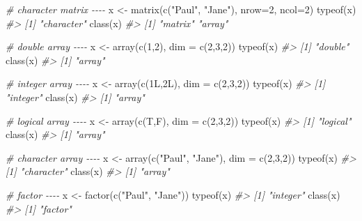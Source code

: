 \documentclass[
]{book}
\newenvironment{Shaded}{\begin{snugshade}}{\end{snugshade}}
\newcommand{\AttributeTok}[1]{\textcolor[rgb]{0.77,0.63,0.00}{#1}}
\newcommand{\CommentTok}[1]{\textcolor[rgb]{0.56,0.35,0.01}{\textit{#1}}}
\newcommand{\DecValTok}[1]{\textcolor[rgb]{0.00,0.00,0.81}{#1}}
\newcommand{\FunctionTok}[1]{\textcolor[rgb]{0.00,0.00,0.00}{#1}}
\newcommand{\NormalTok}[1]{#1}
\newcommand{\OtherTok}[1]{\textcolor[rgb]{0.56,0.35,0.01}{#1}}
\newcommand{\StringTok}[1]{\textcolor[rgb]{0.31,0.60,0.02}{#1}}
\begin{document}
\begin{Shaded}
\begin{Highlighting}[]
\CommentTok{\# character matrix {-}{-}{-}{-}}
\NormalTok{x }\OtherTok{\textless{}{-}} \FunctionTok{matrix}\NormalTok{(}\FunctionTok{c}\NormalTok{(}\StringTok{"Paul"}\NormalTok{, }\StringTok{"Jane"}\NormalTok{), }\AttributeTok{nrow=}\DecValTok{2}\NormalTok{, }\AttributeTok{ncol=}\DecValTok{2}\NormalTok{)}
\FunctionTok{typeof}\NormalTok{(x)}
\CommentTok{\#\textgreater{} [1] "character"}
\FunctionTok{class}\NormalTok{(x)}
\CommentTok{\#\textgreater{} [1] "matrix" "array"}

\CommentTok{\# double array {-}{-}{-}{-}}
\NormalTok{x }\OtherTok{\textless{}{-}} \FunctionTok{array}\NormalTok{(}\FunctionTok{c}\NormalTok{(}\DecValTok{1}\NormalTok{,}\DecValTok{2}\NormalTok{), }\AttributeTok{dim =} \FunctionTok{c}\NormalTok{(}\DecValTok{2}\NormalTok{,}\DecValTok{3}\NormalTok{,}\DecValTok{2}\NormalTok{))}
\FunctionTok{typeof}\NormalTok{(x)}
\CommentTok{\#\textgreater{} [1] "double"}
\FunctionTok{class}\NormalTok{(x)}
\CommentTok{\#\textgreater{} [1] "array"}

\CommentTok{\# integer array {-}{-}{-}{-}}
\NormalTok{x }\OtherTok{\textless{}{-}} \FunctionTok{array}\NormalTok{(}\FunctionTok{c}\NormalTok{(1L,2L), }\AttributeTok{dim =} \FunctionTok{c}\NormalTok{(}\DecValTok{2}\NormalTok{,}\DecValTok{3}\NormalTok{,}\DecValTok{2}\NormalTok{))}
\FunctionTok{typeof}\NormalTok{(x)}
\CommentTok{\#\textgreater{} [1] "integer"}
\FunctionTok{class}\NormalTok{(x)}
\CommentTok{\#\textgreater{} [1] "array"}

\CommentTok{\# logical array {-}{-}{-}{-}}
\NormalTok{x }\OtherTok{\textless{}{-}} \FunctionTok{array}\NormalTok{(}\FunctionTok{c}\NormalTok{(T,F), }\AttributeTok{dim =} \FunctionTok{c}\NormalTok{(}\DecValTok{2}\NormalTok{,}\DecValTok{3}\NormalTok{,}\DecValTok{2}\NormalTok{))}
\FunctionTok{typeof}\NormalTok{(x)}
\CommentTok{\#\textgreater{} [1] "logical"}
\FunctionTok{class}\NormalTok{(x)}
\CommentTok{\#\textgreater{} [1] "array"}

\CommentTok{\# character array {-}{-}{-}{-}}
\NormalTok{x }\OtherTok{\textless{}{-}} \FunctionTok{array}\NormalTok{(}\FunctionTok{c}\NormalTok{(}\StringTok{"Paul"}\NormalTok{, }\StringTok{"Jane"}\NormalTok{), }\AttributeTok{dim =} \FunctionTok{c}\NormalTok{(}\DecValTok{2}\NormalTok{,}\DecValTok{3}\NormalTok{,}\DecValTok{2}\NormalTok{))}
\FunctionTok{typeof}\NormalTok{(x)}
\CommentTok{\#\textgreater{} [1] "character"}
\FunctionTok{class}\NormalTok{(x)}
\CommentTok{\#\textgreater{} [1] "array"}

\CommentTok{\# factor {-}{-}{-}{-}}
\NormalTok{x }\OtherTok{\textless{}{-}} \FunctionTok{factor}\NormalTok{(}\FunctionTok{c}\NormalTok{(}\StringTok{"Paul"}\NormalTok{, }\StringTok{"Jane"}\NormalTok{))}
\FunctionTok{typeof}\NormalTok{(x)}
\CommentTok{\#\textgreater{} [1] "integer"}
\FunctionTok{class}\NormalTok{(x)}
\CommentTok{\#\textgreater{} [1] "factor"}


\end{Highlighting}
\end{Shaded}
\end{document}

